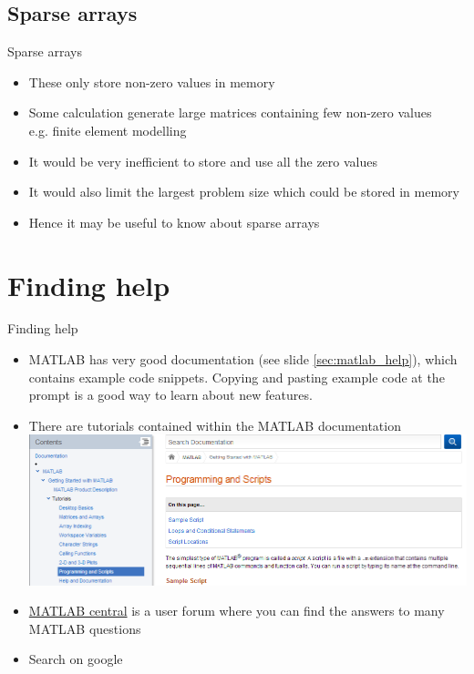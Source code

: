 \documentclass{beamer}
\begin{document}
\subsection{Sparse arrays}
\begin{frame}{Sparse arrays}{}
	\begin{itemize}
		\item These only store non-zero values in memory
		\item Some calculation generate large matrices containing few non-zero values\\
		e.g. finite element modelling
		\item It would be very inefficient to store and use all the zero values
		\item It would also limit the largest problem size which could be stored in memory
		\item Hence it may be useful to know about sparse arrays
	\end{itemize}
\end{frame}

\section{Finding help}
\begin{frame}{Finding help}
	\begin{itemize}
		\item MATLAB has very good documentation (see slide \ref{sec:matlab_help}), which contains  example code snippets. Copying and pasting example code at the prompt is a good way to learn about new features.
		\item There are tutorials contained within the MATLAB documentation\\		
		\includegraphics[width=\textwidth]{matlab_doc_tutorials}
		\item \href{http://uk.mathworks.com/matlabcentral/?s_tid=gn_mlc}{MATLAB central} is a user forum where you can find the answers to many MATLAB questions
		\item Search on google
	\end{itemize}
\end{frame}
\end{document}
